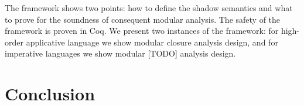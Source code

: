 \documentclass{article}
\begin{document}
The framework shows two points: how to define the shadow semantics and
what to prove for the soundness of consequent modular analysis. The
safety of the framework is proven in Coq. We present two instances of the
framework: for high-order applicative language we show modular
closure analysis design, and for imperative languages we show modular
  [TODO] analysis design.

\clearpage

\clearpage

\clearpage


\section{Conclusion}
\end{document}
